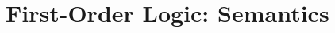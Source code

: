 \documentclass[a4paper, 11pt]{article} %
\begin{document}
%
%
%
%





\section*{\sc First-Order Logic: Semantics}
\end{document}
